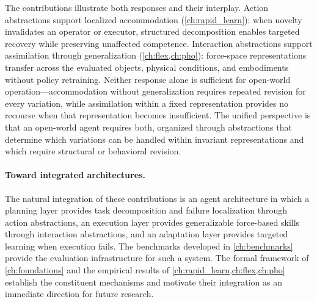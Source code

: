 The contributions illustrate both responses and their interplay. Action abstractions support localized accommodation (\cref{ch:rapid_learn}): when novelty invalidates an operator or executor, structured decomposition enables targeted recovery while preserving unaffected competence. Interaction abstractions support assimilation through generalization (\cref{ch:flex,ch:pho}): force-space representations transfer across the evaluated objects, physical conditions, and embodiments without policy retraining. Neither response alone is sufficient for open-world operation---accommodation without generalization requires repeated revision for every variation, while assimilation within a fixed representation provides no recourse when that representation becomes insufficient. The unified perspective is that an open-world agent requires both, organized through abstractions that determine which variations can be handled within invariant representations and which require structural or behavioral revision.

\paragraph{Toward integrated architectures.}
The natural integration of these contributions is an agent architecture in which a planning layer provides task decomposition and failure localization through action abstractions, an execution layer provides generalizable force-based skills through interaction abstractions, and an adaptation layer provides targeted learning when execution fails. The benchmarks developed in \cref{ch:benchmarks} provide the evaluation infrastructure for such a system. The formal framework of \cref{ch:foundations} and the empirical results of \cref{ch:rapid_learn,ch:flex,ch:pho} establish the constituent mechanisms and motivate their integration as an immediate direction for future research.
